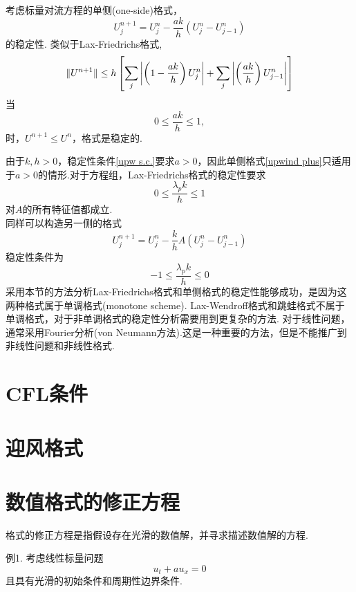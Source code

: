 \begin{myexample}
	考虑标量对流方程的单侧(one-side)格式，
	\begin{equation} \label{upwind plus}
		U_j^{n+1} = U_j^n - \frac{ak}{h}(U_j^n - U_{j-1}^n)
	\end{equation}
	的稳定性.
	类似于Lax-Friedrichs格式,
	\begin{equation}
		\lVert U^{n+1}\rVert \le h \left[ \sum_j    \left| \left( 1-\frac{ak}{h}\right)U_j^n \right|  + \sum_j \left| \left( \frac{ak}{h}\right)U_{j-1}^n \right|  \right]
	\end{equation}
	当
	\begin{equation}\label{upw s.c.}
		0 \le \frac{ak}{h} \le 1,
	\end{equation}
	时，$U^{n+1}\le U^n$，格式是稳定的.
\end{myexample}
由于$k,h >0$，稳定性条件\eqref{upw s.c.}要求$a>0$，因此单侧格式\eqref{upwind plus}只适用于$a>0$的情形.对于方程组，Lax-Friedrichs格式的稳定性要求
	\begin{equation}
    	 0 \le \frac{\lambda_p k}{h}   \le 1
	\end{equation}
对$A$的所有特征值都成立.\\
同样可以构造另一侧的格式
	\begin{equation} 
		U_j^{n+1} = U_j^n - \frac{k}{h}A(U_j^n - U_{j-1}^n)
	\end{equation}
稳定性条件为
	\begin{equation}
	-1 \le \frac{\lambda_p k}{h}   \le 0
	\end{equation}
	采用本节的方法分析Lax-Friedrichs格式和单侧格式的稳定性能够成功，是因为这两种格式属于单调格式(monotone scheme). Lax-Wendroff格式和跳蛙格式不属于单调格式，对于非单调格式的稳定性分析需要用到更复杂的方法. 对于线性问题，通常采用Fourier分析(von Neumann方法).这是一种重要的方法，但是不能推广到非线性问题和非线性格式.
	
\section{CFL条件}

\section{迎风格式}

\section{数值格式的修正方程}
	格式的修正方程是指假设存在光滑的数值解，并寻求描述数值解的方程.

例1. 考虑线性标量问题 \nocite{Leveque92}
	\begin{equation*}
		u_t + a u_x = 0
	\end{equation*}
	且具有光滑的初始条件和周期性边界条件.